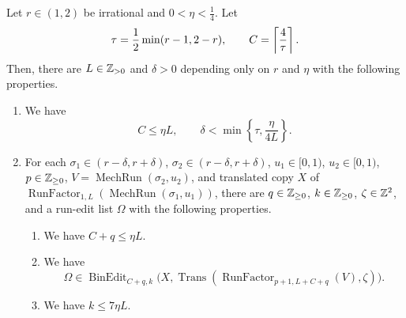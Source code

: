 \begin{lemma}\label{lem:binary-factor-comparison}
Let $r\in(1,2)$ be irrational and $0<\eta<\frac14$. Let
\[
 \tau=\frac12\min(r-1,2-r),\qquad C=\left\lceil\frac4\tau\right\rceil.
\]
Then, there are $L\in\mathbb Z_{>0}$ and $\delta>0$ depending only on $r$ and $\eta$ with the following properties.
\begin{enumerate}
\item\label{c:binary-factor-constants} We have
\[
 C\le\eta L,\qquad \delta<\min\left\{\tau,\frac{\eta}{4L}\right\}.
\]
\item\label{c:binary-factor-uniform} For each $\sigma_1\in(r-\delta,r+\delta)$, $\sigma_2\in(r-\delta,r+\delta)$,
$u_1\in[0,1)$, $u_2\in[0,1)$, $p\in\mathbb Z_{\ge0}$, $V=\operatorname{MechRun}(\sigma_2,u_2)$, and translated copy $X$ of
$\operatorname{RunFactor}_{1,L}(\operatorname{MechRun}(\sigma_1,u_1))$,
there are $q\in\mathbb Z_{\ge0}$, $k\in\mathbb Z_{\ge0}$, $\zeta\in\mathbb Z^2$, and a run-edit list $\Omega$ with the following properties.
\begin{enumerate}[label=(\alph*),ref=\theenumi(\alph*)]
\item\label{c:binary-factor-budget} We have $C+q\le\eta L$.
\item\label{c:binary-factor-target} We have
\[
 \Omega\in\operatorname{BinEdit}_{C+q,k}
 \bigl(X,\operatorname{Trans}(\operatorname{RunFactor}_{p+1,L+C+q}(V),\zeta)\bigr).
\]
\item\label{c:binary-factor-exchanges} We have $k\le7\eta L$.
\end{enumerate}
\end{enumerate}
\end{lemma}

